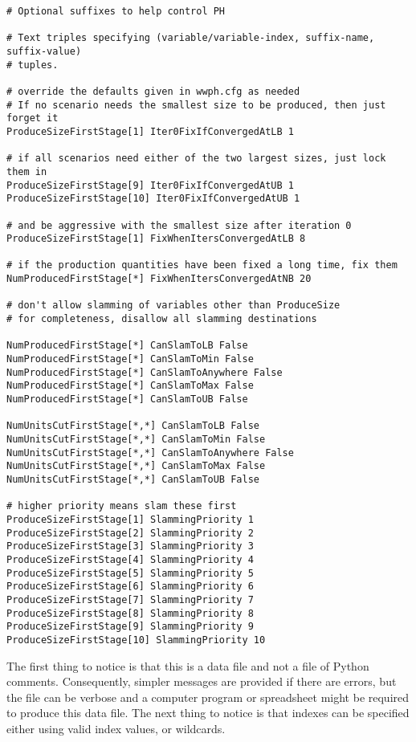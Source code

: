 {\small
\begin{verbatim}
# Optional suffixes to help control PH

# Text triples specifying (variable/variable-index, suffix-name, suffix-value)
# tuples.

# override the defaults given in wwph.cfg as needed
# If no scenario needs the smallest size to be produced, then just forget it
ProduceSizeFirstStage[1] Iter0FixIfConvergedAtLB 1

# if all scenarios need either of the two largest sizes, just lock them in
ProduceSizeFirstStage[9] Iter0FixIfConvergedAtUB 1
ProduceSizeFirstStage[10] Iter0FixIfConvergedAtUB 1

# and be aggressive with the smallest size after iteration 0
ProduceSizeFirstStage[1] FixWhenItersConvergedAtLB 8

# if the production quantities have been fixed a long time, fix them
NumProducedFirstStage[*] FixWhenItersConvergedAtNB 20

# don't allow slamming of variables other than ProduceSize
# for completeness, disallow all slamming destinations

NumProducedFirstStage[*] CanSlamToLB False
NumProducedFirstStage[*] CanSlamToMin False
NumProducedFirstStage[*] CanSlamToAnywhere False
NumProducedFirstStage[*] CanSlamToMax False
NumProducedFirstStage[*] CanSlamToUB False

NumUnitsCutFirstStage[*,*] CanSlamToLB False
NumUnitsCutFirstStage[*,*] CanSlamToMin False
NumUnitsCutFirstStage[*,*] CanSlamToAnywhere False
NumUnitsCutFirstStage[*,*] CanSlamToMax False
NumUnitsCutFirstStage[*,*] CanSlamToUB False

# higher priority means slam these first
ProduceSizeFirstStage[1] SlammingPriority 1
ProduceSizeFirstStage[2] SlammingPriority 2
ProduceSizeFirstStage[3] SlammingPriority 3
ProduceSizeFirstStage[4] SlammingPriority 4
ProduceSizeFirstStage[5] SlammingPriority 5
ProduceSizeFirstStage[6] SlammingPriority 6
ProduceSizeFirstStage[7] SlammingPriority 7
ProduceSizeFirstStage[8] SlammingPriority 8
ProduceSizeFirstStage[9] SlammingPriority 9
ProduceSizeFirstStage[10] SlammingPriority 10

\end{verbatim}
}

The first thing to notice is that this is a data file and not a file of Python
comments. Consequently, simpler messages are provided if there are errors, but
the file can be verbose and a computer program or spreadsheet might be required
to produce this data file. The next thing to notice is that indexes can be
specified either using valid index values, or wildcards.

